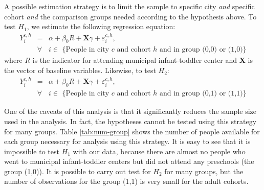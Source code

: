 A possible estimation strategy is to limit the sample to specific city \textit{and} specific cohort \textit{and} the comparison groups needed according to the hypothesis above. To test $H_1$, we estimate the following regression equation:
\begin{eqnarray}
Y_{i}^{c,h} & = & \alpha + \beta_{0}R + \mathbf{X}\gamma + \varepsilon_{i}^{c,h}, \\ \nonumber
& \forall & i \in \text{ \{People in city $c$ and cohort $h$ and in group (0,0) or (1,0)\}}
\end{eqnarray}
where $R$ is the indicator for attending municipal infant-toddler center and $\mathbf{X}$ is the vector of baseline variables. Likewise, to test $H_2$:
\begin{eqnarray}
Y_{i}^{c,h} & = & \alpha + \beta_{0}R + \mathbf{X}\gamma + \varepsilon_{i}^{c,h}, \\ \nonumber
& \forall & i \in \text{ \{People in city $c$ and cohort $h$ and in group (0,1) or (1,1)\}}
\end{eqnarray}

One of the caveats of this analysis is that it significantly reduces the sample size used in the analysis. In fact, the hypotheses cannot be tested using this strategy for many groups. Table \ref{tab:num-group} shows the number of people available for each group necessary for analysis using this strategy. It is easy to see that it is impossible to test $H_1$ with our data, because there are almost no people who went to municipal infant-toddler centers but did not attend any preschools (the group (1,0)). It is possible to carry out test for $H_2$ for many groups, but the number of observations for the group (1,1) is very small for the adult cohorts. 

